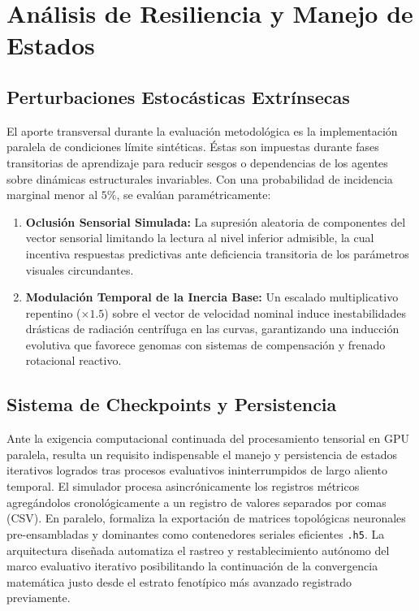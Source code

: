 \documentclass[10pt,twocolumn,letterpaper]{article}
\begin{document}
\section{Análisis de Resiliencia y Manejo de Estados}

\subsection{Perturbaciones Estocásticas Extrínsecas}
El aporte transversal durante la evaluación metodológica es la implementación paralela de condiciones límite sintéticas. Éstas son impuestas durante fases transitorias de aprendizaje para reducir sesgos o dependencias de los agentes sobre dinámicas estructurales invariables. Con una probabilidad de incidencia marginal menor al $5\%$, se evalúan paramétricamente:
\begin{enumerate}
    \item \textbf{Oclusión Sensorial Simulada:} La supresión aleatoria de componentes del vector sensorial limitando la lectura al nivel inferior admisible, la cual incentiva respuestas predictivas ante deficiencia transitoria de los parámetros visuales circundantes. 
    \item \textbf{Modulación Temporal de la Inercia Base:} Un escalado multiplicativo repentino ($\times 1.5$) sobre el vector de velocidad nominal induce inestabilidades drásticas de radiación centrífuga en las curvas, garantizando una inducción evolutiva que favorece genomas con sistemas de compensación y frenado rotacional reactivo.
\end{enumerate}

\subsection{Sistema de Checkpoints y Persistencia}
Ante la exigencia computacional continuada del procesamiento tensorial en GPU paralela, resulta un requisito indispensable el manejo y persistencia de estados iterativos logrados tras procesos evaluativos ininterrumpidos de largo aliento temporal. El simulador procesa asincrónicamente los registros métricos agregándolos cronológicamente a un registro de valores separados por comas (CSV). En paralelo, formaliza la exportación de matrices topológicas neuronales pre-ensambladas y dominantes como contenedores seriales eficientes \texttt{.h5}. La arquitectura diseñada automatiza el rastreo y restablecimiento autónomo del marco evaluativo iterativo posibilitando la continuación de la convergencia matemática justo desde el estrato fenotípico más avanzado registrado previamente.
\end{document}
